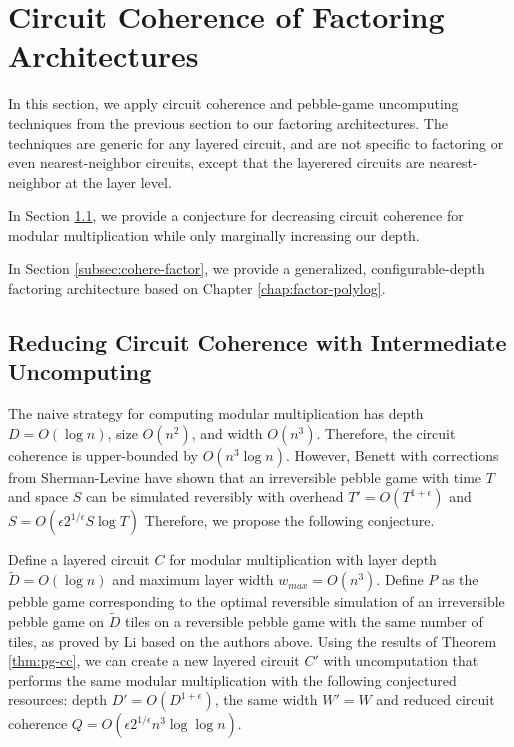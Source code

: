 \section{Circuit Coherence of Factoring Architectures}
\label{sec:cohere-factor}

In this section, we apply circuit coherence and pebble-game
uncomputing techniques from the previous section to our
factoring architectures. The techniques are generic for
any layered circuit, and are not specific to factoring or
even nearest-neighbor circuits, except that the layerered circuits
are nearest-neighbor at the layer level.

In Section \ref{subsec:cohere-conject}, we provide a conjecture
for decreasing circuit coherence for modular multiplication while
only marginally increasing our depth.

In Section \ref{subsec:cohere-factor}, we provide a generalized,
configurable-depth factoring architecture based on
Chapter \ref{chap:factor-polylog}.

\subsection{Reducing Circuit Coherence with Intermediate Uncomputing}
\label{subsec:cohere-conject}

The naive strategy for computing modular multiplication has
depth $D = O(\log n)$, size $O(n^2)$, and width $O(n^3)$. Therefore, the
circuit coherence is upper-bounded by $O(n^3 \log n)$. However,
Benett \cite{Bennett1989} with corrections from
Sherman-Levine \cite{Levine1990} have shown that an irreversible
pebble game with time $T$ and space $S$ can be simulated reversibly
with overhead $T' = O(T^{1+\epsilon})$ and $S = O(\epsilon 2^{1/\epsilon} S \log T)$
Therefore, we propose the following conjecture.

\begin{conjecture}
Define a layered circuit $C$ for modular multiplication
with layer depth $\tilde{D} = O(\log n)$ and maximum layer width
$w_{max} = O(n^3)$.
Define $P$ as the pebble game corresponding to the optimal reversible simulation of
an irreversible pebble game on $\tilde{D}$ tiles on a reversible
pebble game with the same number of tiles, as proved by
Li \cite{Li1998} based on the authors above.
Using the results of Theorem \ref{thm:pg-cc}, we can create a new
layered circuit $C'$ with uncomputation that performs the
same modular multiplication with the following conjectured resources:
depth $D' = O(D^{1+\epsilon})$,
the same width $W' = W$
and reduced circuit coherence $Q = O(\epsilon 2^{1/\epsilon} n^3 \log\log n)$.
\end{conjecture}


